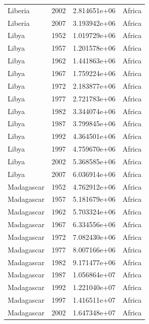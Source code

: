 \documentclass[
  letterpaper,
  DIV=11,
  numbers=noendperiod]{scrreprt}
\begin{document}
\begin{tcolorbox}
\begin{tabular}{lrrl}
Liberia                  &  2002 &  2.814651e+06 &    Africa \\
Liberia                  &  2007 &  3.193942e+06 &    Africa \\
Libya                    &  1952 &  1.019729e+06 &    Africa \\
Libya                    &  1957 &  1.201578e+06 &    Africa \\
Libya                    &  1962 &  1.441863e+06 &    Africa \\
Libya                    &  1967 &  1.759224e+06 &    Africa \\
Libya                    &  1972 &  2.183877e+06 &    Africa \\
Libya                    &  1977 &  2.721783e+06 &    Africa \\
Libya                    &  1982 &  3.344074e+06 &    Africa \\
Libya                    &  1987 &  3.799845e+06 &    Africa \\
Libya                    &  1992 &  4.364501e+06 &    Africa \\
Libya                    &  1997 &  4.759670e+06 &    Africa \\
Libya                    &  2002 &  5.368585e+06 &    Africa \\
Libya                    &  2007 &  6.036914e+06 &    Africa \\
Madagascar               &  1952 &  4.762912e+06 &    Africa \\
Madagascar               &  1957 &  5.181679e+06 &    Africa \\
Madagascar               &  1962 &  5.703324e+06 &    Africa \\
Madagascar               &  1967 &  6.334556e+06 &    Africa \\
Madagascar               &  1972 &  7.082430e+06 &    Africa \\
Madagascar               &  1977 &  8.007166e+06 &    Africa \\
Madagascar               &  1982 &  9.171477e+06 &    Africa \\
Madagascar               &  1987 &  1.056864e+07 &    Africa \\
Madagascar               &  1992 &  1.221040e+07 &    Africa \\
Madagascar               &  1997 &  1.416511e+07 &    Africa \\
Madagascar               &  2002 &  1.647348e+07 &    Africa \\

\end{tabular}
\end{tcolorbox}
\end{document}
